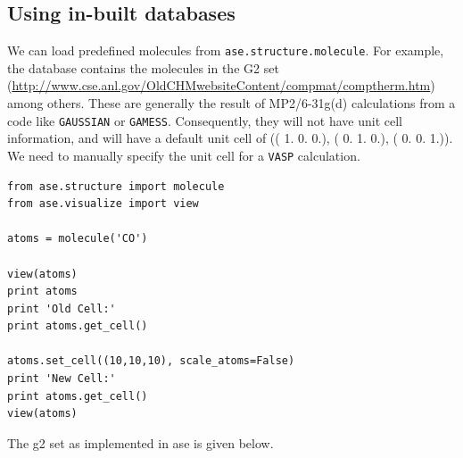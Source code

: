 \documentclass[11pt]{article}
\begin{document}
\subsection{Using in-built databases}
\label{sec-4-2}

We can load predefined molecules from \verb~ase.structure.molecule~. For example, the database contains the molecules in the G2 set (\url{http://www.cse.anl.gov/OldCHMwebsiteContent/compmat/comptherm.htm}) among others. These are generally the result of MP2/6-31g(d) calculations from a code like \texttt{GAUSSIAN} or \texttt{GAMESS}. Consequently, they will not have unit cell information, and will have a default unit cell of  (( 1.  0.  0.), ( 0.  1.  0.), ( 0.  0.  1.)). We need to manually specify the unit cell for a \texttt{VASP} calculation.

\begin{verbatim}
from ase.structure import molecule
from ase.visualize import view

atoms = molecule('CO')

view(atoms)
print atoms
print 'Old Cell:'
print atoms.get_cell()

atoms.set_cell((10,10,10), scale_atoms=False)
print 'New Cell:'
print atoms.get_cell()
view(atoms)
\end{verbatim}

The g2 set as implemented in ase is given below.
\end{document}
